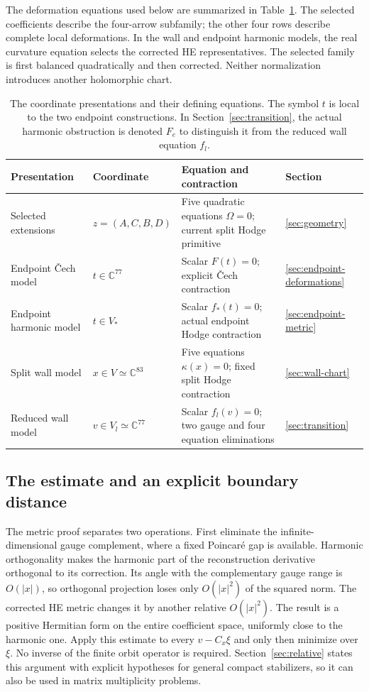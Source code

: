 \documentclass[11pt]{amsart}
\theoremstyle{definition}
\theoremstyle{remark}
\newcommand{\CC}{\mathbb C}
\begin{document}


The deformation equations used below are summarized in Table~\ref{tab:charts}.
The selected coefficients describe the four-arrow subfamily; the other
four rows describe complete local deformations. In the wall and endpoint
harmonic models, the real curvature equation selects the corrected HE
representatives. The selected family is first balanced quadratically and
then corrected. Neither normalization introduces another holomorphic chart.
\begin{table}[htbp]
\centering\small
\begin{tabular}{@{}>{\raggedright\arraybackslash}p{}>{\raggedright\arraybackslash}p{}>{\raggedright\arraybackslash}p{}>{\raggedright\arraybackslash}p{}@{}}
\toprule
Presentation & Coordinate & Equation and contraction & Section\\
\midrule
Selected extensions & $z=(A,C,B,D)$ & Five quadratic equations $\Omega=0$;
current split Hodge primitive & \ref{sec:geometry}\\[3pt]
Endpoint \v Cech model & $t\in\CC^{77}$ & Scalar $F(t)=0$;
explicit \v Cech contraction & \ref{sec:endpoint-deformations}\\[3pt]
Endpoint harmonic model & $t\in V_*$ & Scalar $f_*(t)=0$;
actual endpoint Hodge contraction & \ref{sec:endpoint-metric}\\[3pt]
Split wall model & $x\in V\simeq\CC^{83}$ & Five equations $\kappa(x)=0$;
fixed split Hodge contraction & \ref{sec:wall-chart}\\[3pt]
Reduced wall model & $v\in V_l\simeq\CC^{77}$ & Scalar $f_l(v)=0$;
two gauge and four equation eliminations & \ref{sec:transition}\\
\bottomrule
\end{tabular}
\caption{The coordinate presentations and their defining equations.
The symbol $t$ is local to the two endpoint constructions. In Section~\ref{sec:transition},
the actual harmonic obstruction is denoted $F_e$ to distinguish it from
the reduced wall equation $f_l$.}
\label{tab:charts}
\end{table}

\subsection{The estimate and an explicit boundary distance}
The metric proof separates two operations. First eliminate the
infinite-dimensional gauge complement, where a fixed Poincar\'e gap
is available. Harmonic orthogonality makes the harmonic part of the reconstruction
derivative orthogonal to its correction. Its angle with the complementary
gauge range is $O(|x|)$, so orthogonal projection loses only
$O(|x|^2)$ of the squared norm. The corrected HE metric changes it
by another relative $O(|x|^2)$. The result is a positive Hermitian
form on the entire coefficient space, uniformly close to the harmonic
one. Apply this estimate to every $v-C_x\xi$ and only then minimize
over $\xi$. No inverse of the finite orbit operator is required.
Section~\ref{sec:relative} states this argument with explicit hypotheses
for general compact stabilizers, so it can also be used in matrix
multiplicity problems.
\end{document}
